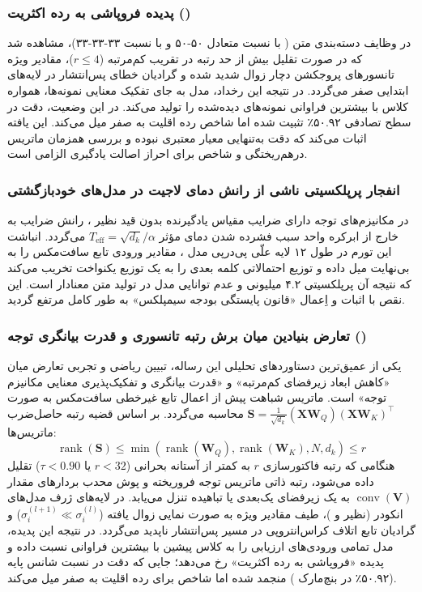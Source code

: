 \subsubsection{پدیده فروپاشی به رده اکثریت ()}
در وظایف دسته‌بندی متن ( با نسبت متعادل ۵۰-۵۰ و  با نسبت ۳۳-۳۳-۳۳)، مشاهده شد که در صورت تقلیل بیش از حد رتبه در تقریب کم‌مرتبه ($r \le 4$)، مقادیر ویژه تانسورهای پروجکشن دچار زوال شدید شده و گرادیان خطای پس‌انتشار در لایه‌های ابتدایی صفر می‌گردد. در نتیجه این رخداد، مدل به جای تفکیک معنایی نمونه‌ها، همواره کلاس با بیشترین فراوانی نمونه‌های دیده‌شده را تولید می‌کند.
در این وضعیت، دقت در سطح تصادفی ۵۰.۹۲٪ تثبیت شده اما شاخص  رده اقلیت به صفر میل می‌کند. این یافته اثبات می‌کند که دقت به‌تنهایی معیار معتبری نبوده و بررسی همزمان ماتریس درهم‌ریختگی و شاخص  برای احراز اصالت یادگیری الزامی است.

\subsubsection{انفجار پرپلکسیتی ناشی از رانش دمای لاجیت در مدل‌های خودبازگشتی}
در مکانیزم‌های توجه دارای ضرایب مقیاس یادگیرنده بدون قید نظیر ، رانش ضرایب به خارج از ابرکره واحد سبب فشرده شدن دمای مؤثر $T_{\text{eff}} = \sqrt{d_k} / \alpha$ می‌گردد. انباشت این تورم در طول ۱۲ لایه علّی پی‌درپی مدل ، مقادیر ورودی تابع سافت‌مکس را به بی‌نهایت میل داده و توزیع احتمالاتی کلمه بعدی را به یک توزیع یکنواخت تخریب می‌کند که نتیجه آن پرپلکسیتی ۴.۲ میلیونی و عدم توانایی مدل در تولید متن معنادار است. این نقص با اثبات و اِعمال «قانون پایستگی بودجه سیمپلکس» به طور کامل مرتفع گردید.

\subsubsection{تعارض بنیادین میان برش رتبه تانسوری و قدرت بیانگری توجه ()}
یکی از عمیق‌ترین دستاوردهای تحلیلی این رساله، تبیین ریاضی و تجربی تعارض میان «کاهش ابعاد زیرفضای کم‌مرتبه» و «قدرت بیانگری و تفکیک‌پذیری معنایی مکانیزم توجه» است. ماتریس شباهت پیش از اعمال تابع غیرخطی سافت‌مکس به صورت $\mathbf{S} = \frac{1}{\sqrt{d_k}} (\mathbf{X} \mathbf{W}_Q) (\mathbf{X} \mathbf{W}_K)^\top$ محاسبه می‌گردد. بر اساس قضیه رتبه حاصل‌ضرب ماتریس‌ها:
\begin{equation}
\operatorname{rank}(\mathbf{S}) \le \min\left( \operatorname{rank}(\mathbf{W}_Q), \operatorname{rank}(\mathbf{W}_K), N, d_k \right) \le r
\end{equation}
هنگامی که رتبه فاکتورسازی $r$ به کمتر از آستانه بحرانی ($r < 32$ یا $\tau < 0.90$) تقلیل داده می‌شود، رتبه ذاتی ماتریس توجه فروریخته و پوش محدب بردار‌های مقدار $\operatorname{conv}(\mathbf{V})$ به یک زیرفضای یک‌بعدی یا تباهیده تنزل می‌یابد. در لایه‌های ژرف مدل‌های انکودر (نظیر  و )، طیف مقادیر ویژه به صورت نمایی زوال یافته ($\sigma_i^{(l+1)} \ll \sigma_i^{(l)}$) و گرادیان تابع اتلاف کراس‌انتروپی در مسیر پس‌انتشار ناپدید می‌گردد. در نتیجه این پدیده، مدل تمامی ورودی‌های ارزیابی را به کلاس پیشین با بیشترین فراوانی نسبت داده و پدیده «فروپاشی به رده اکثریت» رخ می‌دهد؛ جایی که دقت در نسبت شانس پایه (۵۰.۹۲٪ در بنچ‌مارک ) منجمد شده اما شاخص  برای رده اقلیت به صفر میل می‌کند.

